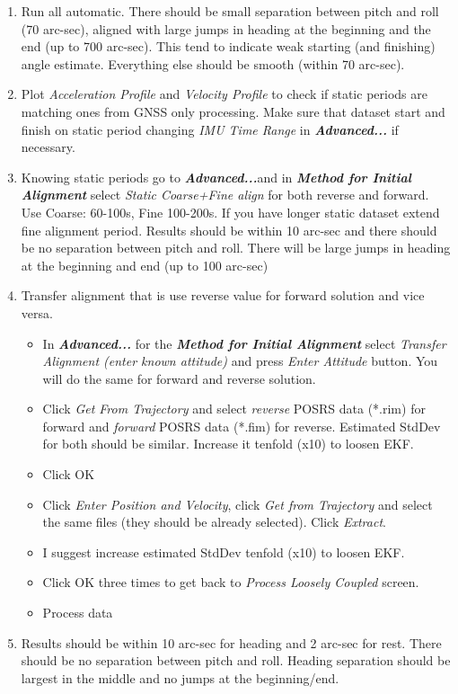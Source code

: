 \documentclass[11pt,fleqn]{book} %
\begin{document}
\begin{enumerate}
	\item Run all automatic. There should be small separation between pitch and roll (70 arc-sec), aligned with large jumps in heading at the beginning and the end (up to 700 arc-sec). This tend to indicate weak starting (and finishing) angle estimate. Everything else should be smooth (within 70 arc-sec).
	\item Plot \emph{Acceleration Profile} and \emph{Velocity Profile} to check if static periods are matching ones from GNSS only processing. Make sure that dataset start and finish on static period changing \textit{IMU Time Range} in \textbf{\emph{Advanced...}} if necessary.
	\item Knowing static periods go to \textbf{\emph{Advanced...}}and in \textbf{\emph{Method for Initial Alignment}} select \emph{Static Coarse+Fine align} for both reverse and forward. Use Coarse: 60-100s, Fine 100-200s. If you have longer static dataset extend fine alignment period. Results should be within 10 arc-sec and there should be no separation between pitch and roll. There will be large jumps in heading at the beginning and end (up to 100 arc-sec) 
	\item Transfer alignment that is use reverse value for forward solution and vice versa.
	\begin{itemize}
		\item In \textbf{\emph{Advanced...}} for the \textbf{\emph{Method for Initial Alignment}} select \emph{Transfer Alignment (enter known attitude) }and press\emph{ Enter Attitude }button. You will do the same for forward and reverse solution.
		\item Click \emph{Get From Trajectory }and select \emph{reverse} POSRS data ({*}.rim) for forward and \emph{forward} POSRS data ({*}.fim) for reverse. Estimated StdDev for both should be similar. Increase it tenfold (x10) to loosen EKF. 
		\item Click OK
		\item Click \emph{Enter Position and Velocity}, click \emph{ Get from Trajectory} and select the same files (they should be already selected). Click \emph{Extract}.
		\item I suggest increase estimated StdDev tenfold (x10) to loosen EKF. 
		\item Click OK three times to get back to \emph{Process Loosely Coupled} screen.
		\item Process data
	\end{itemize}
	\item Results should be within 10 arc-sec for heading and 2 arc-sec for rest. There should be no separation between pitch and roll. Heading separation should be largest in the middle and no jumps at the beginning/end. 
\end{enumerate}
\end{document}
